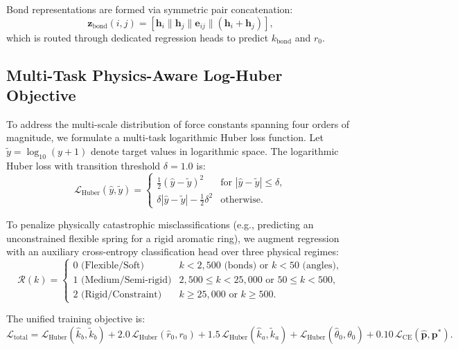 \documentclass[11pt,a4paper]{article}
\begin{document}
Bond representations are formed via symmetric pair concatenation:
\begin{equation}
\mathbf{z}_{\text{bond}}(i, j) = [\mathbf{h}_i \parallel \mathbf{h}_j \parallel \mathbf{e}_{ij} \parallel (\mathbf{h}_i + \mathbf{h}_j)],
\end{equation}
which is routed through dedicated regression heads to predict $k_{\text{bond}}$ and $r_0$.

\subsection{Multi-Task Physics-Aware Log-Huber Objective}
To address the multi-scale distribution of force constants spanning four orders of magnitude, we formulate a multi-task logarithmic Huber loss function. Let $\tilde{y} = \log_{10}(y + 1)$ denote target values in logarithmic space. The logarithmic Huber loss with transition threshold $\delta = 1.0$ is:
\begin{equation}
\mathcal{L}_{\text{Huber}}(\hat{y}, \tilde{y}) = 
\begin{cases} 
\frac{1}{2}(\hat{y} - \tilde{y})^2 & \text{for } |\hat{y} - \tilde{y}| \le \delta, \\
\delta |\hat{y} - \tilde{y}| - \frac{1}{2}\delta^2 & \text{otherwise.}
\end{cases}
\end{equation}

To penalize physically catastrophic misclassifications (e.g., predicting an unconstrained flexible spring for a rigid aromatic ring), we augment regression with an auxiliary cross-entropy classification head over three physical regimes:
\begin{equation}
\mathcal{R}(k) = 
\begin{cases}
0 \text{ (Flexible/Soft)} & k < 2{,}500\text{ (bonds) or } k < 50\text{ (angles)}, \\
1 \text{ (Medium/Semi-rigid)} & 2{,}500 \le k < 25{,}000\text{ or } 50 \le k < 500, \\
2 \text{ (Rigid/Constraint)} & k \ge 25{,}000\text{ or } k \ge 500.
\end{cases}
\end{equation}

The unified training objective is:
\begin{equation}
\mathcal{L}_{\text{total}} = \mathcal{L}_{\text{Huber}}(\hat{k}_b, \tilde{k}_b) + 2.0\,\mathcal{L}_{\text{Huber}}(\hat{r}_0, r_0) + 1.5\,\mathcal{L}_{\text{Huber}}(\hat{k}_a, \tilde{k}_a) + \mathcal{L}_{\text{Huber}}(\hat{\theta}_0, \theta_0) + 0.10\,\mathcal{L}_{\text{CE}}(\hat{\mathbf{p}}, \mathbf{p}^*).
\label{eq:total_loss}
\end{equation}
\end{document}
